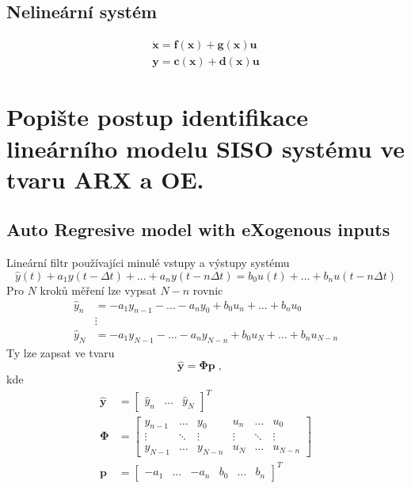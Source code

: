 \documentclass{article}
\begin{document}
	\subsection*{Nelineární systém}
	\begin{align}
		\bm{\dot{x}} = \bm{f}(\bm{x}) + \bm{g}(\bm{x})\bm{u} \\
		\bm{y} = \bm{c}(\bm{x}) + \bm{d}(\bm{x}) \bm{u}
	\end{align}

	\section{Popište postup identifikace lineárního modelu SISO systému ve tvaru ARX a OE. }
	
	\subsection{Auto Regresive model with eXogenous inputs}
	Lineární filtr používajíci minulé vstupy a výstupy systému
	\begin{equation}
		\hat{y}(t) + a_1 y(t-\Delta t) + \dots + a_n y(t-n\Delta t)
		=
		b_0 u(t) + \dots + b_n u(t-n\Delta t)
	\end{equation}
	Pro $N$ kroků měření lze vypsat $N-n$ rovnic
	\begin{align*}
		\hat{y}_n &= -a_1 y_{n-1} - \dots - a_n y_0 + b_0 u_n + \dots + b_n u_0 \\
		&\vdots \\
		\hat{y}_N &= -a_1 y_{N-1} - \dots - a_n y_{N-n} + b_0 u_N + \dots + b_n u_{N-n}
	\end{align*}
	Ty lze zapsat ve tvaru
	\begin{equation}
	\bm{\hat{y}} = \bm{\Phi} \bm{p}
	\;,\quad 
	\end{equation}
	kde
	\begin{align*}
		\bm{\hat{y}} &= \begin{bmatrix} \hat{y}_n & \dots & \hat{y}_N \end{bmatrix}^T
		\\ 
		\bm{\Phi}
		&=
		\begin{bmatrix}
			y_{n-1} & \dots & y_0 & u_n & \dots & u_0 \\
			\vdots & \ddots & \vdots & \vdots & \ddots & \vdots \\
			y_{N-1} & \dots & y_{N-n} & u_N & \dots & u_{N-n}
		\end{bmatrix}
		\\ 
		\bm{p} &= \begin{bmatrix} -a_1 & \dots & -a_n & b_0 & \dots & b_n \end{bmatrix}^T
	\end{align*}
\end{document}
